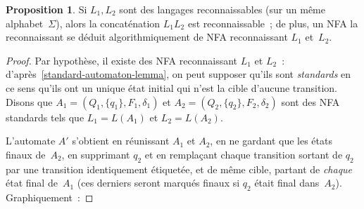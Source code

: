 \documentclass[12pt,a4paper]{article}
\theoremstyle{definition}
\newtheorem{prop}[comcnt]{Proposition}
\begin{document}
\begin{prop}\label{nfa-concatenation}
Si $L_1,L_2$ sont des langages reconnaissables (sur un même
alphabet $\Sigma$), alors la concaténation $L_1 L_2$ est reconnaissable ; de plus, un
NFA la reconnaissant se déduit algorithmiquement de NFA reconnaissant
$L_1$ et $L_2$.
\end{prop}
\begin{proof}
Par hypothèse, il existe des NFA reconnaissant $L_1$ et $L_2$ :
d'après \ref{standard-automaton-lemma}, on peut supposer qu'ils sont
\emph{standards} en ce sens qu'ils ont un unique état initial qui
n'est la cible d'aucune transition.  Disons que $A_1 =
(Q_1,\{q_1\},F_1,\delta_1)$ et $A_2 = (Q_2,\{q_2\},F_2,\delta_2)$ sont
des NFA standards tels que $L_1 = L(A_1)$ et $L_2 = L(A_2)$.

L'automate $A'$ s'obtient en réunissant $A_1$ et $A_2$, en ne gardant
que les états finaux de $A_2$, en supprimant $q_2$ et en remplaçant
chaque transition sortant de $q_2$ par une transition identiquement
étiquetée, et de même cible, partant de \emph{chaque} état final
de $A_1$ (ces derniers seront marqués finaux si $q_2$ était final
dans $A_2$).  Graphiquement :


\end{proof}
\end{document}
